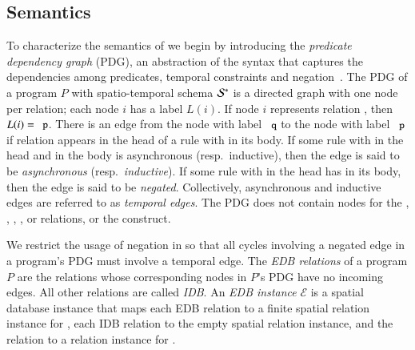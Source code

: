 


\subsection{Semantics}
\label{sec:semantics}
To characterize the semantics of \lang we begin by introducing the {\em predicate dependency graph} (PDG), an abstraction of the \lang syntax that
captures the dependencies among predicates, temporal constraints and negation~\cite{ullmanbook}.
The PDG of a \lang program $P$ with spatio-temporal schema $\stschema$ is a
directed graph with one node per relation; each node $i$ has a label $L(i)$.  If node $i$ represents relation , then $L(i) = \dedalus{p}$.  There is an edge from the node with label $\dedalus{q}$ to the node with label $\dedalus{p}$ if relation  appears in the head of a rule with  in its body.  If some rule with  in the head and  in the body is asynchronous (resp.\ inductive), then the edge is said to be {\em asynchronous} (resp.\ {\em inductive}).  If some rule with  in the head has  in its body, then the edge is said to be {\em negated}.  Collectively, asynchronous and inductive edges are referred to as {\em temporal edges}.  The PDG does not contain nodes for the , , , , or \dedalus{<} relations, or the  construct.

We restrict the usage of negation in \lang so that all cycles involving a negated edge in a \lang program's PDG must involve a temporal edge.
The {\em EDB relations} of a \lang program $P$ are the relations whose corresponding nodes in $P$'s PDG have no incoming edges.  All other relations are called {\em IDB}.
An {\em EDB instance} $\mathcal{E}$  is a spatial database instance that maps each EDB relation  to a finite spatial relation instance for , each IDB relation to the empty spatial relation instance, and the  relation to a relation instance for .

